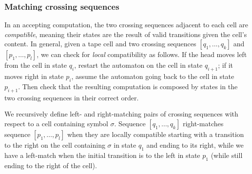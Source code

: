 \subsubsection{Matching crossing sequences}
In an accepting computation, the two crossing sequences adjacent to each cell are \emph{compatible}, meaning their states are the result of valid transitions given the cell's content.
In general, given a tape cell and two crossing sequences $[q_1,\dots,q_k]$ and $[p_1,\dots,p_l]$, we can check for \emph{local} compatibility as follows.
If the head moves left from the cell in state $q_i$, restart the automaton on the cell in state $q_{i+1}$; if it moves right in state $p_i$, assume the automaton going back to the cell in state $p_{i+1}$.
Then check that the resulting computation is composed by states in the two crossing sequences in their correct order.

We recursively define left- and right-matching pairs of crossing sequences with respect to a cell containing symbol $\sigma$.
Sequence $[q_1,\dots,q_k]$ right-matches sequence $[p_1,\dots,p_l]$ when they are locally compatible starting with a transition to the right on the cell containing $\sigma$ in state $q_1$ and ending to its right, while we have a left-match when the initial transition is to the left in state $p_1$ (while still ending to the right of the cell).

